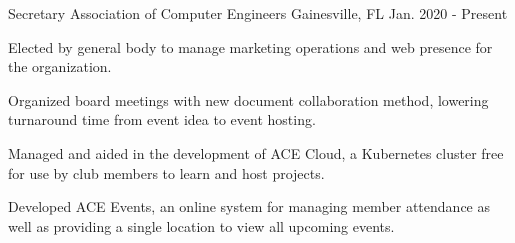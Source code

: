 \begin{cventries}
  \cventry
    {Secretary}
    {Association of Computer Engineers}
    {Gainesville, FL}
    {Jan. 2020 - Present}
    {
      \begin{cvitems}
        \item {Elected by general body to manage marketing operations and web presence for the organization.}
        \item {Organized board meetings with new document collaboration method, lowering turnaround time from event idea to event hosting.}
        \item {Managed and aided in the development of ACE Cloud, a Kubernetes cluster free for use by club members to learn and host projects.}
        \item {Developed ACE Events, an online system for managing member attendance as well as providing a single location to view all upcoming events.}
      \end{cvitems}
    }
\end{cventries}
